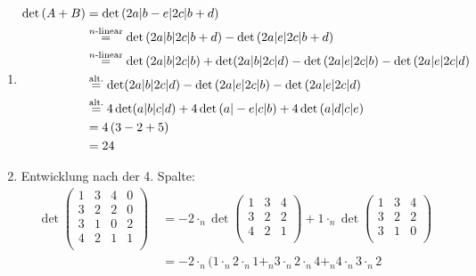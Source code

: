 \documentclass[sectionformat = aufgabe]{gadsescript}
\begin{document}
\subsection{}
\begin{enumerate}[label=(\alph*)]
	\item
		\begin{align*}
			\det\left( A + B \right) &= \det\left( 2a | b - e | 2c | b + d \right)  \\
			~ &\overset{\text{$ n $-linear} }{=} \det\left( 2a | b | 2c | b + d \right) - \det\left( 2a | e | 2c | b + d \right)  \\
			~ &\overset{\text{$ n $-linear} }{=} \det\left( 2a | b | 2c | b \right) + \det ( 2a | b | 2c | d ) - \det\left( 2a | e | 2c | b \right) - \det\left( 2a | e | 2c | d \right)  \\
			~ &\overset{\text{alt.} }{=} \det ( 2a | b | 2c | d ) - \det\left( 2a | e | 2c | b \right) - \det\left( 2a | e | 2c | d \right)  \\
			~ &\overset{\text{alt.} }{=} 4 \det ( a | b | c | d ) + 4 \det\left( a | - e | c | b \right) + 4\det\left( a | d | c | e \right)  \\
			~ &= 4 \left( 3 - 2 + 5 \right)  \\
			~ &= 24 \\
		\end{align*}
	\item
		Entwicklung nach der 4. Spalte:
		\begin{align*}
			\det
			\begin{pmatrix} 
				1 & 3 & 4 & 0 \\
				3 & 2 & 2 & 0 \\
				3 & 1 & 0 & 2 \\
				4 & 2 & 1 & 1 \\
			\end{pmatrix} 
			~ &= 
			- 2 \cdot _n
			\det
			\begin{pmatrix} 
				1 & 3 & 4 \\
				3 & 2 & 2 \\
				4 & 2 & 1 \\
			\end{pmatrix} 
			+
			1 \cdot _n
			\det
			\begin{pmatrix} 
				1 & 3 & 4 \\
				3 & 2 & 2 \\
				3 & 1 & 0 \\
			\end{pmatrix} 
			\\
			~ &= - 2 \cdot _n ( 1 \cdot _n 2 \cdot _n 1 +_n 3 \cdot _n 2 \cdot _n 4 +_n 4 \cdot _n 3 \cdot _n 2 \\

\end{align*}
\end{enumerate}
\end{document}
